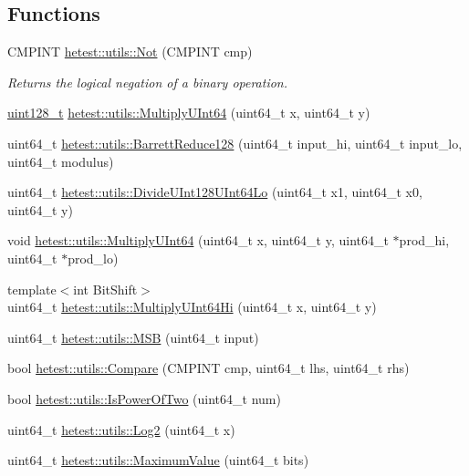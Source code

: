 \subsection*{Functions}
\begin{DoxyCompactItemize}
\item 
C\-M\-P\-I\-N\-T \hyperlink{namespacehetest_1_1utils_aab7d7acb16b2a22388513ae84818214c}{hetest\-::utils\-::\-Not} (C\-M\-P\-I\-N\-T cmp)
\begin{DoxyCompactList}\small\item\em Returns the logical negation of a binary operation. \end{DoxyCompactList}\item 
\hyperlink{utils-test_8hpp_ab76ef99db23830c7fec1e3019737cab4}{uint128\-\_\-t} \hyperlink{namespacehetest_1_1utils_af38bb2ec0ec65a229877d4a3bdbe787f}{hetest\-::utils\-::\-Multiply\-U\-Int64} (uint64\-\_\-t x, uint64\-\_\-t y)
\item 
uint64\-\_\-t \hyperlink{namespacehetest_1_1utils_a842729d820bda62d95f80ebdde202ac6}{hetest\-::utils\-::\-Barrett\-Reduce128} (uint64\-\_\-t input\-\_\-hi, uint64\-\_\-t input\-\_\-lo, uint64\-\_\-t modulus)
\item 
uint64\-\_\-t \hyperlink{namespacehetest_1_1utils_a8c18008a708b9e3146f8c5bb95317415}{hetest\-::utils\-::\-Divide\-U\-Int128\-U\-Int64\-Lo} (uint64\-\_\-t x1, uint64\-\_\-t x0, uint64\-\_\-t y)
\item 
void \hyperlink{namespacehetest_1_1utils_a8329306e8a458a7ce160ef870e59a9a3}{hetest\-::utils\-::\-Multiply\-U\-Int64} (uint64\-\_\-t x, uint64\-\_\-t y, uint64\-\_\-t $\ast$prod\-\_\-hi, uint64\-\_\-t $\ast$prod\-\_\-lo)
\item 
{\footnotesize template$<$int Bit\-Shift$>$ }\\uint64\-\_\-t \hyperlink{namespacehetest_1_1utils_a625cc618050dc0a7fe3fc1720224018b}{hetest\-::utils\-::\-Multiply\-U\-Int64\-Hi} (uint64\-\_\-t x, uint64\-\_\-t y)
\item 
uint64\-\_\-t \hyperlink{namespacehetest_1_1utils_a5f70a68d72b65afc296c5d38def31235}{hetest\-::utils\-::\-M\-S\-B} (uint64\-\_\-t input)
\item 
bool \hyperlink{namespacehetest_1_1utils_abde8eb855b18fb857dbbd7b06d96fd66}{hetest\-::utils\-::\-Compare} (C\-M\-P\-I\-N\-T cmp, uint64\-\_\-t lhs, uint64\-\_\-t rhs)
\item 
bool \hyperlink{namespacehetest_1_1utils_a968364009ecc6add3849c161d7a1088f}{hetest\-::utils\-::\-Is\-Power\-Of\-Two} (uint64\-\_\-t num)
\item 
uint64\-\_\-t \hyperlink{namespacehetest_1_1utils_acb4bd5dad64e6c1db0f2b4e1afaa63db}{hetest\-::utils\-::\-Log2} (uint64\-\_\-t x)
\item 
uint64\-\_\-t \hyperlink{namespacehetest_1_1utils_a959fdf1d396b9b4f4362486106e7f655}{hetest\-::utils\-::\-Maximum\-Value} (uint64\-\_\-t bits)
\end{DoxyCompactItemize}
